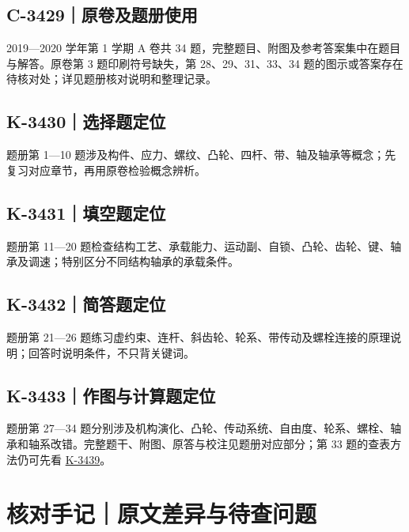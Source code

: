 \documentclass[zihao=5,a4paper,UTF8,fontset=fandol]{ctexart}
\begin{document}
\subsection{C-3429｜原卷及题册使用}
\label{c-3429}

2019—2020 学年第 1 学期 A 卷共 34 题，完整题目、附图及参考答案集中在题目与解答。原卷第 3 题印刷符号缺失，第 28、29、31、33、34 题的图示或答案存在待核对处；详见题册核对说明和整理记录。





\subsection{K-3430｜选择题定位}
\label{k-3430}

题册第 1—10 题涉及构件、应力、螺纹、凸轮、四杆、带、轴及轴承等概念；先复习对应章节，再用原卷检验概念辨析。





\subsection{K-3431｜填空题定位}
\label{k-3431}

题册第 11—20 题检查结构工艺、承载能力、运动副、自锁、凸轮、齿轮、键、轴承及调速；特别区分不同结构轴承的承载条件。





\subsection{K-3432｜简答题定位}
\label{k-3432}

题册第 21—26 题练习虚约束、连杆、斜齿轮、轮系、带传动及螺栓连接的原理说明；回答时说明条件，不只背关键词。





\subsection{K-3433｜作图与计算题定位}
\label{k-3433}

题册第 27—34 题分别涉及机构演化、凸轮、传动系统、自由度、轮系、螺栓、轴承和轴系改错。完整题干、附图、原答与校注见题册对应部分；第 33 题的查表方法仍可先看 \hyperref[k-3439]{K-3439}。


\section{核对手记｜原文差异与待查问题}
\end{document}
